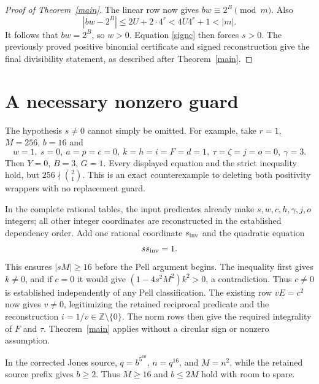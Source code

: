 \documentclass[11pt]{article}
\newcommand{\Z}{\mathbb Z}\newcommand{\Q}{\mathbb Q}
\begin{document}
\begin{proof}[Proof of Theorem~\ref{main}]
The linear row now gives \(bw\equiv2^B\pmod m\). Also
\[
 |bw-2^B|\le2U+2\cdot4^r<4U4^r+1<|m|.
\]
It follows that \(bw=2^B\), so \(w>0\). Equation \eqref{signc}
then forces \(s>0\). The previously proved positive binomial
certificate and signed reconstruction give the final divisibility
statement, as described after Theorem~\ref{main}.
\end{proof}

\section{A necessary nonzero guard}\label{implementation}

The hypothesis \(s\ne0\) cannot simply be omitted. For example,
take \(r=1\), \(M=256\), \(b=16\) and
\[
 w=1,\ s=0,\ a=p=c=0,\ k=h=i=F=d=1,\
 \tau=\zeta=j=o=0,\ \gamma=3.
\]
Then \(Y=0\), \(B=3\), \(G=1\). Every displayed equation
and the strict inequality hold, but
\(256\nmid\binom21\). This is an exact counterexample to deleting
both positivity wrappers with no replacement guard.

In the complete rational tables, the input predicates already make
\(s,w,c,h,\gamma,j,o\) integers; all other integer coordinates are
reconstructed in the established dependency order. Add one rational
coordinate \(s_{\rm inv}\) and the quadratic equation
\begin{equation}\label{guard}
                         s s_{\rm inv}=1.
\end{equation}
This ensures \(|sM|\ge16\) before the Pell argument begins.
The inequality first gives \(k\ne0\), and if \(c=0\) it would
give \((1-4s^2M^2)k^2>0\), a contradiction. Thus \(c\ne0\)
is established independently of any Pell classification. The existing
row \(vE=c^2\) now gives \(v\ne0\), legitimizing the retained
reciprocal predicate and the reconstruction \(i=1/v\in\Z\setminus\{0\}\).
The norm rows then give the required integrality of \(F\) and
\(\tau\). Theorem~\ref{main} applies without a circular sign or
nonzero assumption.

In the corrected Jones source, \(q=b^{5^{60}}\), \(n=q^{16}\),
and \(M=n^2\), while the retained source prefix gives \(b\ge2\).
Thus \(M\ge16\) and \(b\le2M\) hold with room to spare.
\end{document}
